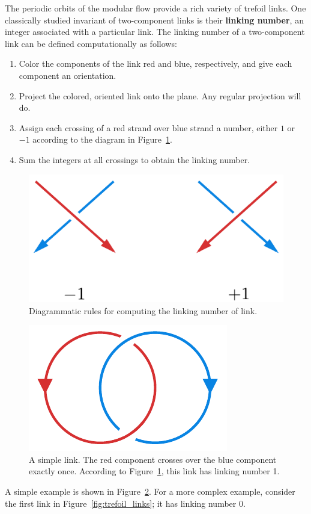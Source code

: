 \documentclass[12pt,twoside]{reedthesis}
\theoremstyle{definition}
\newcommand{\defnphrase}[1]{\textbf{#1}}
\begin{document}
The periodic orbits of the modular flow provide a rich variety of trefoil links.
One classically studied invariant of two-component links is their \defnphrase{linking number}, an integer associated with a particular link. The linking number of a two-component link can be defined computationally as follows:

\begin{enumerate}
  \item Color the components of the link red and blue, respectively, and give each component an orientation.
  \item Project the colored, oriented link onto the plane. Any regular projection will do.
  \item Assign each crossing of a red strand over blue strand a number, either $1$ or $-1$ according to the diagram in Figure~\ref{fig:linking_number}.
  \item Sum the integers at all crossings to obtain the linking number.
\end{enumerate}

\begin{figure}[t]
  \centering
  \includegraphics[width=0.3\linewidth]{figures/linking_number.pdf}
  \caption{Diagrammatic rules for computing the linking number of link.}
  \label{fig:linking_number}
\end{figure}

\begin{figure}[b]
  \centering
  \includegraphics[width=0.3\linewidth]{figures/linking_number_example.pdf}
  \caption{A simple link. The red component crosses over the blue component exactly once. According to Figure~\ref{fig:linking_number}, this link has linking number 1.}
  \label{fig:linking_number_example}
\end{figure}

A simple example is shown in Figure~\ref{fig:linking_number_example}.
For a more complex example, consider the first link in Figure~\ref{fig:trefoil_links}; it has linking number 0.
\end{document}
